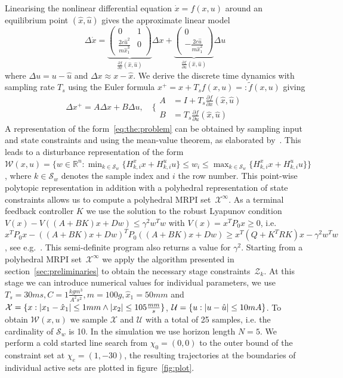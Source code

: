 Linearising the nonlinear differential 
equation $\dot x = f(x,u)$ around an equilibrium point $(\hat x, \hat
u)$ gives the approximate linear model 
%
\[
	 \Delta\dot{x} = \underbrace{\left(\begin{array}{cc}
	0 & 1 \\ \frac{2c\hat u^2}{m\hat x_1^3} & 0
	\end{array}\right)}_{\frac{\partial f}{\partial x}(\hat x,\hat
      u)}\Delta x 
+ \underbrace{\left(\begin{array}{c}
	0 \\ - \frac{2c\hat u}{m\hat x_1^2}
	\end{array}\right)}_{\frac{\partial f}{\partial u}(\hat x,\hat
      u)}\Delta u
\]
%
where $\Delta u = u -\hat{u}$ and $\Delta x \approx x-\hat{x}$.
We derive the discrete time dynamics with sampling rate $T_s$ using
the Euler formula $x^+=x+T_s f(x,u) =:\tilde f(x,u)$ giving
\[
\Delta x^+ = A \Delta x + B \Delta u , \quad
\Biggl\{\begin{aligned} A &= I+T_s\frac{\partial f}{\partial  x}(\hat
  x,\hat u) \\
B &= T_s \frac{\partial f}{\partial u}(\hat x,\hat u)
\end{aligned}
\]
%
A representation of the form~\eqref{eq:the:problem} can be obtained by sampling input and state
constraints and using the mean-value theorem, as elaborated by~\cite{Schaich:2015}. This leads
to a disturbance representation of the form $\mathcal W(x,u)=\{w\in\mathbb R^n: 
\min_{k\in\mathcal S_w}\{ H_{k,i}^x x + H_{k,i}^u u\} \leq w_i \leq \max_{k\in\mathcal S_w} 
\{ H_{k,i}^x x + H_{k,i}^u u \} \}$,
where ${k\in\mathcal S_w}$ denotes the sample index and $i$ the row number. This point-wise polytopic representation
in addition with a polyhedral representation of state constraints allows us to compute a polyhedral
MRPI set~$\mathcal X^\infty$. As a terminal feedback controller $K$ we use the solution to the robust 
Lyapunov condition $V(x)-V((A+BK)x+Dw)\leq \gamma^2 w^Tw$ 
with $V(x)=x^T P_0 x\geq0$, i.e. $x^TP_0x - ((A+BK)x+Dw)^TP_0((A+BK)x+Dw)\geq x^T(Q+K^TRK)x -\gamma^2 w^T w$, 
see e.g.~\cite{Boyd:94}. This semi-definite program also returns a value for $\gamma^2$. Starting from 
a polyhedral MRPI set~$\mathcal X^\infty$ we apply the algorithm presented in section~\ref{sec:preliminaries}
to obtain the necessary stage constraints~$\mathcal Z_k$. At this stage we can introduce numerical values
for individual parameters, we use $T_s=30ms, C=1\frac{kg m^3}{A^2s^2}, m=100g, \hat x_1 = 50mm$ and $\mathcal X=\{x:
\left|x_1- \hat x_1\right|\leq 1mm\wedge \left|x_2\right|\leq 105\frac{mm}{s}\}$, $\mathcal U=\{u:\left| u-\hat u\right|\leq10mA\}$.
To obtain $\mathcal W(x,u)$ we sample $\mathcal X$ and $\mathcal U$ with a total of 25 samples, i.e. the cardinality
of $\mathcal S_w$ is 10. In the simulation we use horizon length $N=5$. We perform a cold started line search from $\chi_0=(0,0)$
to the outer bound of the constraint set at $\chi_e=(1,-30)$, the resulting trajectories at the boundaries of
individual active sets are plotted in figure~\ref{fig:plot}.

